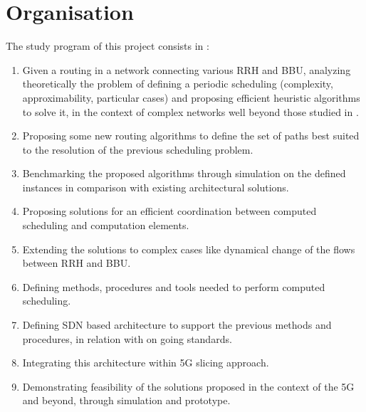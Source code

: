\documentclass{article}
\begin{document}
\section*{Organisation}
The study program of this project consists in :
 \begin{enumerate}
  \item Given a routing in a network connecting various RRH and BBU, analyzing theoretically the problem of defining a periodic scheduling (complexity, approximability, particular cases) and proposing efficient heuristic algorithms to solve it, in the context of complex networks well beyond those studied in \cite{rapportstage}.
\item  Proposing some new routing algorithms to define the set of paths  best suited to the resolution of  the previous scheduling problem.
\item  Benchmarking the proposed algorithms through simulation on the defined instances in comparison with existing architectural solutions.
\item  Proposing solutions for an efficient coordination between computed scheduling and computation elements.
\item  Extending the solutions to complex cases like dynamical change of the flows between RRH and BBU.
\item  Defining methods, procedures and tools needed to perform computed scheduling.
\item  Defining SDN based architecture to support the previous methods and procedures, in relation with on going standards.
\item  Integrating this architecture within 5G slicing approach.
\item  Demonstrating feasibility of the solutions proposed in the context of the 5G and beyond, through simulation and prototype. 
 \end{enumerate}
\end{document}

